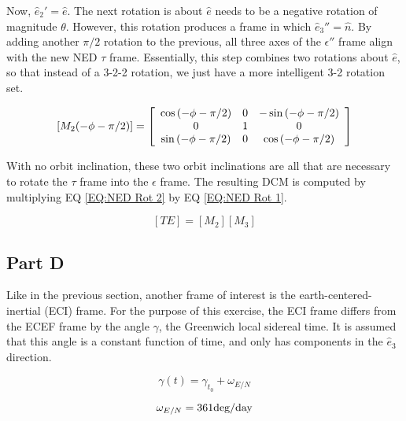 \documentclass[11pt]{aiaa-tc}%
\newcommand{\brackets} [1] {\left[ #1 \right]}
\newcommand{\arrayb}[2]{\brackets{ \begin{array}{#1}  #2 \end{array} } }
\begin{document}
Now, $\hat{e}_2' = \hat{e}$. The next rotation is about $\hat{e}$ needs to be a negative rotation of magnitude $\theta$. However, this rotation produces a frame in which $\hat{e}_3'' = \hat{n}$. By adding another $\pi/2$ rotation to the previous, all three axes of the $\epsilon''$ frame align with the new NED $\tau$ frame. Essentially, this step combines two rotations about $\hat{e}$, so that instead of a 3-2-2 rotation, we just have a more intelligent 3-2 rotation set. 

\begin{equation}
	\label{EQ:NED Rot 2}
	[M_2(-\phi-\pi/2)] = 
	\arrayb{c c c}{
		\cos{(-\phi-\pi/2)} 	& 	0	&	-\sin{(-\phi-\pi/2)}	\\
		0				&	1	& 				0	\\
		\sin{(-\phi-\pi/2)}	&	0	& 	\cos{(-\phi-\pi/2)} 			
	}
\end{equation}

With no orbit inclination, these two orbit inclinations are all that are necessary to rotate the $\tau$ frame into the $\epsilon$ frame. The resulting DCM is computed by multiplying EQ \ref{EQ:NED Rot 2} by EQ \ref{EQ:NED Rot 1}.

\begin{equation}
	\label{EQ:NED DCM}
	[TE] = [M_2][M_3]%
\end{equation}


\subsection{Part D}
Like in the previous section, another frame of interest is the earth-centered-inertial (ECI) frame. For the purpose of this exercise, the ECI frame differs from the ECEF frame by the angle $\gamma$, the Greenwich local sidereal time. It is assumed that this angle is a constant function of time, and only has components in the $\hat{e}_3$ direction. 

\begin{equation}
		\gamma(t) = \gamma_{t_0} + \omega_{E/N}	
		\label{eq:local sidereal}
\end{equation}

\begin{displaymath}
	\omega_{E/N} = 361 \textnormal{deg/day}
\end{displaymath}
\end{document}
